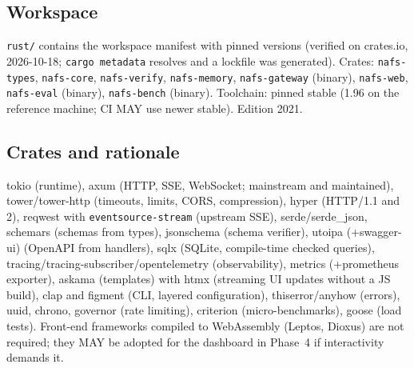 \documentclass[11pt,a4paper]{article}
\begin{document}
\subsection{Workspace}
\begin{sloppypar}\texttt{rust/} contains the workspace manifest with pinned versions (verified on crates.io, 2026-10-18; \texttt{cargo metadata} resolves and a lockfile was generated). Crates: \texttt{nafs-types}, \texttt{nafs-core}, \texttt{nafs-verify}, \texttt{nafs-memory}, \texttt{nafs-gateway} (binary), \texttt{nafs-web}, \texttt{nafs-eval} (binary), \texttt{nafs-bench} (binary). Toolchain: pinned stable (1.96 on the reference machine; CI MAY use newer stable). Edition 2021.\end{sloppypar}
\subsection{Crates and rationale}
\begin{sloppypar}
tokio (runtime), axum (HTTP, SSE, WebSocket; mainstream and maintained), tower/tower-http (timeouts, limits, CORS, compression), hyper (HTTP/1.1 and 2), reqwest with \texttt{eventsource-stream} (upstream SSE), serde/serde\_json, schemars (schemas from types), jsonschema (schema verifier), utoipa (+swagger-ui) (OpenAPI from handlers), sqlx (SQLite, compile-time checked queries), tracing/tracing-subscriber/opentelemetry (observability), metrics (+prometheus exporter), askama (templates) with htmx (streaming UI updates without a JS build), clap and figment (CLI, layered configuration), thiserror/anyhow (errors), uuid, chrono, governor (rate limiting), criterion (micro-benchmarks), goose (load tests). Front-end frameworks compiled to WebAssembly (Leptos, Dioxus) are not required; they MAY be adopted for the dashboard in Phase~4 if interactivity demands it.
\end{sloppypar}
\end{document}
